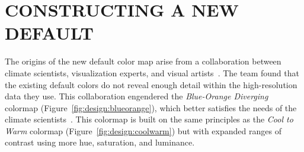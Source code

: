 \documentclass{IEEEcsmag}
\newcommand*{\colormap}[1]{\textsl{#1}\xspace}
\newcommand*{\huewheel}{\colormap{Hue Wheel}}
\newcommand*{\coolwarm}{\colormap{Cool to Warm}}
\newcommand*{\blueorange}{\colormap{Blue-Orange Diverging}}
\newcommand*{\fast}{\colormap{Fast}}
\begin{document}
\section{CONSTRUCTING A NEW DEFAULT}


The origins of the new default color map arise from a collaboration between climate scientists, visualization experts, and visual artists~\cite{Samsel2015}.
The team found that the existing default colors do not reveal enough detail within the high-resolution data they use.
This collaboration engendered the \blueorange colormap (Figure~\ref{fig:design:blueorange}), which better satisfies the needs of the climate scientists~\cite{Samsel2015:SC}.
This colormap is built on the same principles as the \coolwarm colormap (Figure~\ref{fig:design:coolwarm}) but with expanded ranges of contrast using more hue, saturation, and luminance.




\end{document}

